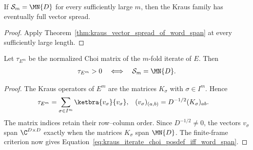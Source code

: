 \begin{theorem}
    \label{thm:kraus_eventually_full_vector_spread_of_word_span}
    \leanok
    If $\mathcal S_m=\MN{D}$ for every sufficiently large $m$, then the
    Kraus family has eventually full vector spread.
\end{theorem}

\begin{proof}
    \leanok
    Apply Theorem~\ref{thm:kraus_vector_spread_of_word_span} at every
    sufficiently large length.
\end{proof}

\begin{theorem}
    \label{thm:kraus_iterate_choi_posdef_iff_word_span}
    \leanok
    Let $\tau_{E^m}$ be the normalized Choi matrix of the $m$-fold iterate of
    $E$. Then
    \begin{align}
        \tau_{E^m}>0
        \quad\Longleftrightarrow\quad
        \mathcal S_m=\MN{D}.
        \label{eq:kraus_iterate_choi_posdef_iff_word_span}
    \end{align}
\end{theorem}

\begin{proof}
    \leanok
    The Kraus operators of $E^m$ are the matrices $K_\sigma$ with
    $\sigma\in I^m$. Hence
    \begin{align}
        \tau_{E^m}
        &=\sum_{\sigma\in I^m}\ketbra{v_\sigma}{v_\sigma},
        &
        (v_\sigma)_{(a,b)}
        &=D^{-1/2}(K_\sigma)_{ab}.
        \notag
    \end{align}
    The matrix indices retain their row--column order. Since $D^{-1/2}\neq0$,
    the vectors $v_\sigma$ span $\C^{D\times D}$ exactly when the matrices
    $K_\sigma$ span $\MN{D}$. The finite-frame criterion now gives
    Equation~\eqref{eq:kraus_iterate_choi_posdef_iff_word_span}.
\end{proof}

